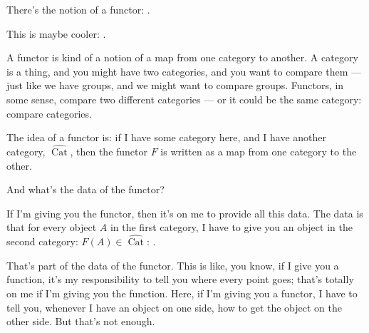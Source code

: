 \begin{speech}[01:22:27 - 01:23:55]
There's the notion of a functor: .

This is maybe cooler: .

A functor is kind of a notion of a map from one category to another. A category is a thing, and you might have two categories, and you want to compare them --- just like we have groups, and we might want to compare groups. Functors, in some sense, compare two different categories  --- or it could be the same category: compare categories.

The idea of a functor is: if I have some category here, and I have another category, $\widehat{\operatorname{Cat}}$,  then the functor $F$ is written as a map from one category to the other.

And what's the data of the functor? 

If I'm giving you the functor, then it's on me to provide all this data. The data is that for every object $A$ in the first category,  I have to give you an object in the second category: $F(A) \in \widehat{\operatorname{Cat}}$: .

That's part of the data of the functor. This is like, you know, if I give you a function, it's my responsibility to tell you where every point goes; that's totally on me if I'm giving you the function. Here, if I'm giving you a functor, I have to tell you, whenever I have an object on one side, how to get the object on the other side. But that's not enough.
\end{speech}


